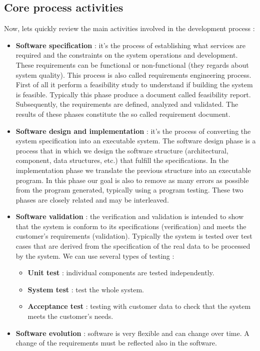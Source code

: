 \documentclass[11pt]{article}
\begin{document}
\subsection{Core process activities}
Now, lets quickly review the main activities involved in the development process :
\begin{itemize}
\item \textbf{Software specification} : it's the process of establishing what services are required and the constraints on the system operations and development. These requirements can be functional or non-functional (they regards about system quality). This process is also called requirements engineering process. First of all it perform a feasibility study to understand if building the system is feasible. Typically this phase produce a document called feasibility report. Subsequently, the requirements are defined, analyzed and validated. The results of these phases constitute the so called requirement document.
\item \textbf{Software design and implementation} : it's the process of converting the system specification into an executable system. The software design phase is a process that in which we design the software structure (architectural, component, data structures, etc.) that fulfill the specifications. In the implementation phase we translate the previous structure into an executable program. In this phase our goal is also to remove as many errors as possible from the program generated, typically using a program testing. These two phases are closely related and may be interleaved. 
\item \textbf{Software validation} : the verification and validation is intended to show that the system is conform to its specifications (verification) and meets the customer's requirements (validation). Typically the system is tested over test cases that are derived from the specification of the real data to be processed by the system. We can use several types of testing :
\begin{itemize}
\item \textbf{Unit test} : individual components are tested independently.
\item \textbf{System test} : test the whole system.
\item \textbf{Acceptance test} : testing with customer data to check that the system meets the customer's needs.
\end{itemize}
\item \textbf{Software evolution} : software is very flexible and can change over time. A change of the requirements must be reflected also in the software.
\end{itemize}
\end{document}
